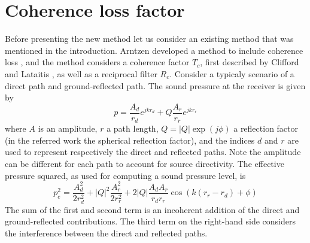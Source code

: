 \section{Coherence loss factor}
Before presenting the new method let us consider an existing method that was
mentioned in the introduction. Arntzen developed a method to include coherence
loss \cite{Arntzen2014a,Arntzen2014b}, and the method considers a coherence factor $T_c$, first described by
Clifford and Lataitis \cite{Clifford1983}, as well as a reciprocal filter $R_c$.
Consider a typicaly scenario of a direct path and ground-reflected path. The
sound pressure at the receiver is given by
\begin{equation}
  p = \frac{A_d}{r_d} e^{j k r_d } + Q \frac{A_r}{r_r} e^{j k r_r }
\end{equation}
where $A$ is an amplitude, $r$ a path length, $Q=|Q|\exp{(j\phi)}$ a reflection
factor (in the referred work the spherical reflection factor), and the indices $d$ and $r$ are used to represent respectively the
direct and reflected paths. Note the amplitude can be different for each path to account for source directivity.
The effective pressure squared, as used for computing a sound pressure level, is
\begin{equation}
  p_{e}^2 = \frac{A_d^2}{2 r_d^2} + |Q|^2 \frac{A_r^2}{2 r_r^2} + 2 |Q| \frac{A_d A_r}{r_d r_r} \cos{\left(k \left( r_r - r_d \right) + \phi  \right)}
\end{equation}
The sum of the first and second term is an incoherent addition of the direct and
ground-reflected contributions. The third term on the right-hand side considers
the interference between the direct and reflected paths.

